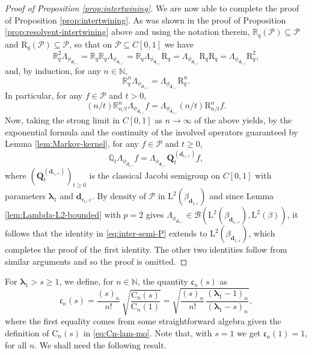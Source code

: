 \documentclass[JEP,XML,SOM,Unicode]{cedram}
\let\epsilon\varepsilon
\theoremstyle{plain}
\theoremstyle{definition}
\newcommand{\N}{\mathbb{N}}
\newcommand{\Poly}{\mathscr{P}}
\newcommand{\C}{{\mathrm{C}}}
\newcommand{\J}{\mathds{Q}}
\newcommand{\Leb}{\mathrm{L}}
\newcommand{\dpt}{\bm{d}_{\vat,\epsilon}}
\newcommand{\dz}{{\bm{d}}_{1,\epsilon}}
\newcommand{\Bop}[2]{\mathcal{B}(#1,#2)}
\newcommand{\lam}{{\bm{\lambda}_1}}
\newcommand{\vat}{{\mathsf{r}_1}}
\newcommand{\Q}[1][\mo]{\mathbf{Q}^{({#1})}}
\newcommand{\gab}[1][\lam,\mo]{{\beta_{#1}}}
\let\mo\mu
\let\bpsi\beta
\begin{document}
\begin{proof}[Proof of Proposition \ref{prop:intertwining}]
We are now able to complete the proof of Proposition \ref{prop:intertwining}. As was shown in the proof of
Proposition \ref{prop:resolvent-intertwining} above and using the notation therein, $\mathds{R}_q(\Poly) \subseteq \Poly$ and $\mathrm{R}_q(\Poly) \subseteq \Poly$, so that on $\Poly \subseteq C[0,1]$ we have
\begin{equation*}
\mathds{R}_q^2 \Lambda_{\phi_{\dz}} = \mathds{R}_q\mathds{R}_q \Lambda_{\phi_{\dz}} = \mathds{R}_q \Lambda_{\phi_{\dz}} \mathrm{R}_q = \Lambda_{\phi_{\dz}} \mathrm{R}_q \mathrm{R}_q = \Lambda_{\phi_{\dz}} \mathrm{R}_q^2,
\end{equation*}
and, by induction, for any $n \in \N$,
\begin{equation*}
\mathds{R}_q^n \Lambda_{\phi_{\dz}} = \Lambda_{\phi_{\dz}} \mathrm{R}_q^n.
\end{equation*}
In particular, for any $f \in \Poly$ and $t > 0$,
\begin{equation*}
(n/t)\mathds{R}_{n/t}^n \Lambda_{\phi_{\dz}} f = \Lambda_{\phi_{\dz}} (n/t)\mathrm{R}_{n/t}^n f.
\end{equation*}
Now, taking the strong limit in $C[0,1]$ as $n\to\infty$ of the above yields, by the exponential formula \cite[Th.\,8.3]{pazy:1983} and the continuity of the involved operators guaranteed by Lemma \ref{lem:Markov-kernel}, for any $f \in \Poly$ and $t \geq 0$,
\begin{equation}
\label{eq:inter-semi-P}
\J_t \Lambda_{\phi_{\dz}} f = \Lambda_{\phi_{\dz}} \Q[\dpt]_t f,
\end{equation}
where $(\Q[\dpt]_t)_{t \geq 0}$ is the classical Jacobi semigroup on $C[0,1]$ with parameters $\lam$ and $\dpt$. By density of $\Poly$ in $\Leb^2(\gab[\dz])$ and since Lemma \ref{lem:Lambda-L2-bounded} with $p=2$ gives $\Lambda_{\phi_{\dz}} \in \Bop{\Leb^2(\gab[\dpt])}{\Leb^2(\bpsi)}$, it follows that the identity in \eqref{eq:inter-semi-P} extends to $\Leb^2(\gab[\dz])$, which completes the proof of the first identity. The other two identities follow from similar arguments and so the proof is omitted.
\end{proof}

For $\lam > s \geq 1$, we define, for $n \in \N$, the quantity $\mathfrak{c}_n(s)$ as
\begin{equation}
\label{eq:defn-cn}
\mathfrak{c}_n(s) = \frac{(s)_n}{n!}\, \sqrt{\frac{\C_n(s)}{\C_n(1)}} = \sqrt{\frac{(s)_n}{n!}\,\frac{(\lam-1)_n}{(\lam-s)_n}},
\end{equation}
where the first equality comes from some straightforward algebra given the definition of $\C_n(s)$ in \eqref{eq:Cn-lam-mo}. Note that, with $s=1$ we get $\mathfrak{c}_n(1) = 1$, for all $n$. We shall need the following result.
\end{document}

